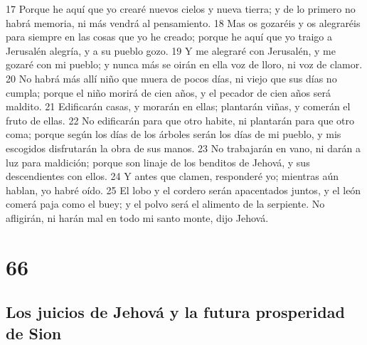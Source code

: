 17 Porque he aquí que yo crearé nuevos cielos y nueva tierra; y de lo primero no habrá memoria, ni más vendrá al pensamiento.
18 Mas os gozaréis y os alegraréis para siempre en las cosas que yo he creado; porque he aquí que yo traigo a Jerusalén alegría, y a su pueblo gozo.
19 Y me alegraré con Jerusalén, y me gozaré con mi pueblo; y nunca más se oirán en ella voz de lloro, ni voz de clamor.
20 No habrá más allí niño que muera de pocos días, ni viejo que sus días no cumpla; porque el niño morirá de cien años, y el pecador de cien años será maldito.
21 Edificarán casas, y morarán en ellas; plantarán viñas, y comerán el fruto de ellas.
22 No edificarán para que otro habite, ni plantarán para que otro coma; porque según los días de los árboles serán los días de mi pueblo, y mis escogidos disfrutarán la obra de sus manos.
23 No trabajarán en vano, ni darán a luz para maldición; porque son linaje de los benditos de Jehová, y sus descendientes con ellos.
24 Y antes que clamen, responderé yo; mientras aún hablan, yo habré oído.
25 El lobo y el cordero serán apacentados juntos, y el león comerá paja como el buey; y el polvo será el alimento de la serpiente. No afligirán, ni harán mal en todo mi santo monte, dijo Jehová. 

\chapter{66}

\section*{Los juicios de Jehová y la futura prosperidad de Sion}

